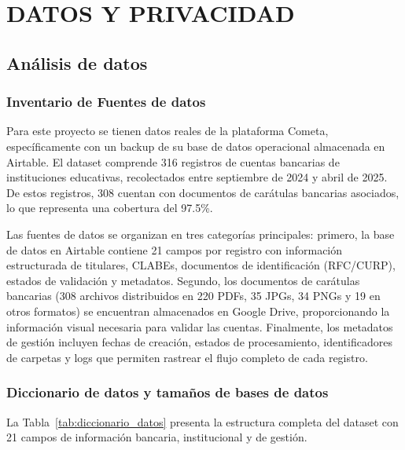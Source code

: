 \chapter{DATOS Y PRIVACIDAD}

\section{Análisis de datos}

\subsection{Inventario de Fuentes de datos}

Para este proyecto se tienen datos reales de la plataforma Cometa, específicamente con un backup de su base de datos operacional almacenada en Airtable. El dataset comprende 316 registros de cuentas bancarias de instituciones educativas, recolectados entre septiembre de 2024 y abril de 2025. De estos registros, 308 cuentan con documentos de carátulas bancarias asociados, lo que representa una cobertura del 97.5\%.

Las fuentes de datos se organizan en tres categorías principales: primero, la base de datos en Airtable contiene 21 campos por registro con información estructurada de titulares, CLABEs, documentos de identificación (RFC/CURP), estados de validación y metadatos. Segundo, los documentos de carátulas bancarias (308 archivos distribuidos en 220 PDFs, 35 JPGs, 34 PNGs y 19 en otros formatos) se encuentran almacenados en Google Drive, proporcionando la información visual necesaria para validar las cuentas. Finalmente, los metadatos de gestión incluyen fechas de creación, estados de procesamiento, identificadores de carpetas y logs que permiten rastrear el flujo completo de cada registro.

\subsection{Diccionario de datos y tamaños de bases de datos}

La Tabla~\ref{tab:diccionario_datos} presenta la estructura completa del dataset con 21 campos de información bancaria, institucional y de gestión.

